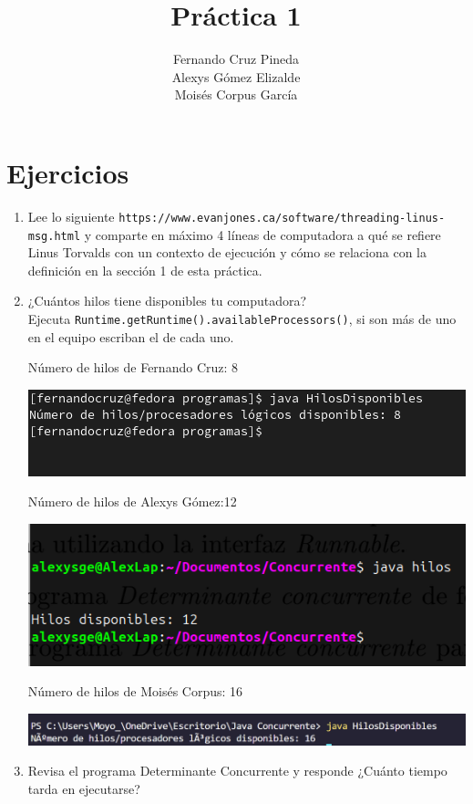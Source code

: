 \documentclass[12pt]{article}
\title{Práctica 1}
\author{Fernando Cruz Pineda \\ Alexys Gómez Elizalde \\ Moisés Corpus García}
\date{}
\begin{document}
\maketitle

\section*{Ejercicios}

\begin{enumerate}
    \item Lee lo siguiente \texttt{https://www.evanjones.ca/software/threading-linus-msg.html} y comparte en máximo 4 líneas de computadora a qué se refiere Linus Torvalds con un contexto de ejecución y cómo se relaciona con la definición en la sección 1 de esta práctica.
    \item ¿Cuántos hilos tiene disponibles tu computadora? \\
      Ejecuta \texttt{Runtime.getRuntime().availableProcessors()}, si son más de uno en el equipo escriban el de cada uno.

      Número de hilos de Fernando Cruz: 8

      \includegraphics[]{Fer.png}

      Número de hilos de Alexys Gómez:12

      \includegraphics[]{1Alexys.png}

      Número de hilos de Moisés Corpus: 16

      \includegraphics[]{ProcesadoresLogicos_Moises_Corpus_Garcia.png}

    \item Revisa el programa Determinante Concurrente y responde ¿Cuánto tiempo tarda en ejecutarse?


\end{enumerate}
\end{document}

